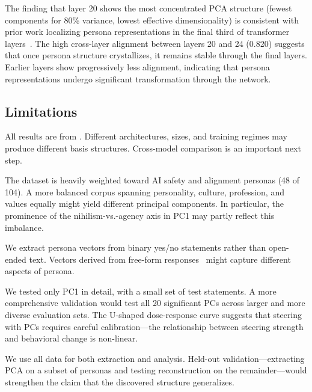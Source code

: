 The finding that layer 20 shows the most concentrated PCA structure (fewest components for 80\% variance, lowest effective dimensionality) is consistent with prior work localizing persona representations in the final third of transformer layers~\citep{cintas2025localizing, feng2026persona}. The high cross-layer alignment between layers 20 and 24 (0.820) suggests that once persona structure crystallizes, it remains stable through the final layers. Earlier layers show progressively less alignment, indicating that persona representations undergo significant transformation through the network.

\subsection{Limitations}
\label{sec:limitations}

All results are from \qwen. Different architectures, sizes, and training regimes may produce different basis structures. Cross-model comparison is an important next step.

The \personaevals dataset is heavily weighted toward AI safety and alignment personas (48 of 104). A more balanced corpus spanning personality, culture, profession, and values equally might yield different principal components. In particular, the prominence of the nihilism-vs.-agency axis in PC1 may partly reflect this imbalance.

We extract persona vectors from binary yes/no statements rather than open-ended text. Vectors derived from free-form responses~\citep{chen2025persona} might capture different aspects of persona.

We tested only PC1 in detail, with a small set of test statements. A more comprehensive validation would test all 20 significant PCs across larger and more diverse evaluation sets. The U-shaped dose-response curve suggests that steering with PCs requires careful calibration---the relationship between steering strength and behavioral change is non-linear.

We use all data for both extraction and analysis. Held-out validation---extracting PCA on a subset of personas and testing reconstruction on the remainder---would strengthen the claim that the discovered structure generalizes.
